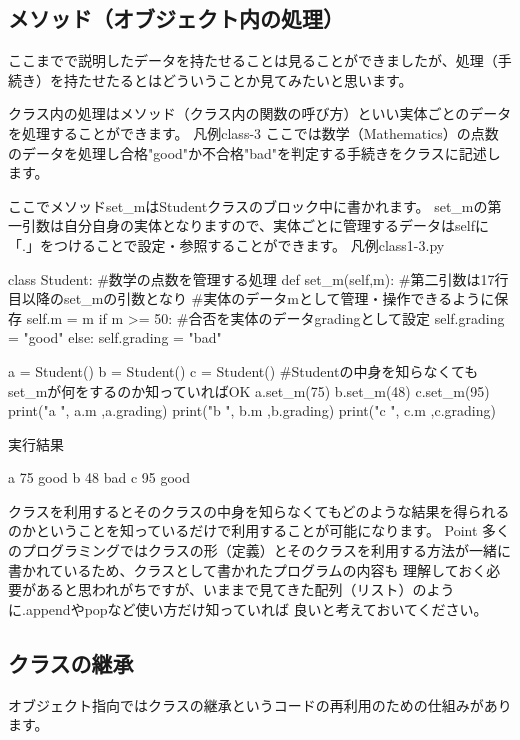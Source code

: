 \subsection{メソッド（オブジェクト内の処理）}
ここまでで説明したデータを持たせることは見ることができましたが、処理（手続き）を持たせたるとはどういうことか見てみたいと思います。

クラス内の処理はメソッド（クラス内の関数の呼び方）といい実体ごとのデータを処理することができます。
\newpage
{\gt 凡例class-3}
ここでは数学（Mathematics）の点数のデータを処理し合格"good"か不合格"bad"を判定する手続きをクラスに記述します。

ここでメソッドset\_mはStudentクラスのブロック中に書かれます。
set\_mの第一引数は自分自身の実体となりますので、実体ごとに管理するデータはselfに「.」をつけることで設定・参照することができます。
{\gt 凡例class1-3.py}
\begin{listing}{1}
class Student: 
    #数学の点数を管理する処理
    def set_m(self,m):
        #第二引数は17行目以降のset_mの引数となり
        #実体のデータmとして管理・操作できるように保存
        self.m = m
        if m >= 50:
            #合否を実体のデータgradingとして設定
            self.grading = "good"
        else:
            self.grading = "bad"

a = Student()
b = Student()
c = Student()
#Studentの中身を知らなくてもset_mが何をするのか知っていればOK
a.set_m(75)
b.set_m(48)
c.set_m(95)
print("a ", a.m ,a.grading)
print("b ", b.m ,b.grading)
print("c ", c.m ,c.grading)
\end{listing}
実行結果
\begin{listing}{1}
a  75 good
b  48 bad
c  95 good
\end{listing}




クラスを利用するとそのクラスの中身を知らなくてもどのような結果を得られるのかということを知っているだけで利用することが可能になります。
{\gt Point}
多くのプログラミングではクラスの形（定義）とそのクラスを利用する方法が一緒に書かれているため、クラスとして書かれたプログラムの内容も
理解しておく必要があると思われがちですが、いままで見てきた配列（リスト）のように.appendやpopなど使い方だけ知っていれば
良いと考えておいてください。


\subsection{クラスの継承}
オブジェクト指向ではクラスの継承というコードの再利用のための仕組みがあります。

